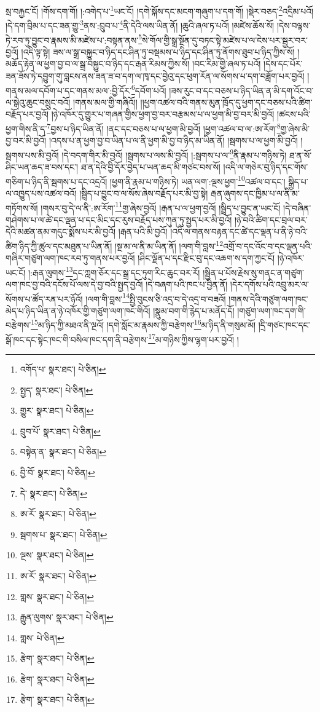 སྲ་བརྐྱང་ངོ། །གོས་དག་གོ། །:འགེད་པ་\footnote{འགོད་པ་  སྣར་ཐང་།  པེ་ཅིན། }ཡང་ངོ། །དགེ་སྐོས་དང་མངག་གཞུག་པ་དག་གོ། །སྡེར་བཅད་\footnote{སྤྱད་  སྣར་ཐང་།  པེ་ཅིན། }འདྲིམ་པའོ། །དེ་དག་བྲིམ་པ་དང་ཟན་གྱུ་\footnote{གྱུར་  སྣར་ཐང་།  པེ་ཅིན། }ནས་:བྲུབ་པ་\footnote{བྲུབ་པོ་  སྣར་ཐང་།  པེ་ཅིན། }ནི་དེའི་ལས་ཡིན་ནོ། །ཆུའི་ཞལ་ཏ་པའོ། །མཛེས་ཆོས་སོ། །དེས་བལྟས་ཏེ་རབ་ཏུ་བྱུང་བ་རྣམས་མི་མཛེས་པ་:བསྟན་ནས་\footnote{བསྟེན་ན་  སྣར་ཐང་།  པེ་ཅིན། }སེ་གོལ་གྱི་སྒྲ་སྔོན་དུ་བཏང་སྟེ་མཛེས་པ་ལ་ངེས་པར་སྦྱར་བར་བྱའོ། །འདི་ལྟ་སྟེ། ཟས་ལ་སྒྲ་བསྐྱུང་བ་ཉིད་དང་ཤིན་ཏུ་བསྡམས་པ་ཉིད་དང་ཤིན་ཏུ་ནོགས་ཐུབ་པ་ཉིད་ཀྱིས་སོ། །མཆོད་རྟེན་ལ་ཕྱག་བྱ་བ་ལ་སྒྲ་བསྐྱུང་བ་ཉིད་དང་རྒན་རིམས་ཀྱིས་སོ། །བང་རིམ་གྱི་ཞལ་ཏ་པའོ། །དེས་དང་པོར་ཟན་ཟོས་ཏེ་དབྱུག་གུ་བླངས་ནས་ཟན་ཟ་བ་དག་ལ་ཁྭ་དང་བྱེའུ་དང་ཕུག་རོན་ལ་སོགས་པ་དག་བཟློག་པར་བྱའོ། །གནས་མལ་དབོག་པ་དང་གནས་མལ་:བྱི་དོར་\footnote{བྱི་བོ་  སྣར་ཐང་།  པེ་ཅིན། }དབོག་པའོ། །ཟས་རུང་བ་དང་བཅས་པ་ཉིད་ཡིན་ན་མི་དག་འོང་བ་ལ་སྒེའུ་ཆུང་བསྲུང་བའོ། །གནས་མལ་གྱི་གཞིའོ།། །།ཕྱག་འཚལ་བའི་གནས་མུན་ཁྲོད་དུ་ཕྱག་དང་བཅས་པའི་ཚིག་བརྗོད་པར་བྱའོ། །ཉེ་འཁོར་དུ་གྱུར་པ་གཞན་གྱིས་ཕྱག་བྱ་བར་བརྩམས་པ་ལ་ཕྱག་མི་བྱ་བར་མི་བྱའོ། །ཚངས་པའི་ཕྱག་གིས་ནི་ད་\footnote{དེ་  སྣར་ཐང་།  པེ་ཅིན། }བྱས་པ་ཉིད་ཡིན་ནོ། །ནང་དང་བཅས་པ་ལ་ཕྱག་མི་བྱའོ། །ཕྱག་འཚལ་བ་ལ་:ཨ་རོག་\footnote{ཨ་རོ་  སྣར་ཐང་།  པེ་ཅིན། }གྱ་ཞེས་མི་བྱ་བར་མི་བྱའོ། །འདས་པ་ན་ཕྱག་བྱ་བ་ཡིན་པ་ལ་ནི་ཕྱག་མི་བྱ་བ་ཉིད་མ་ཡིན་ནོ། །སྦགས་པ་ལ་ཕྱག་མི་བྱའོ། །སྦགས་པས་མི་བྱའོ། །དེ་བདག་གིར་མི་བྱའོ། །སྦགས་པ་ལས་མི་བྱའོ། །:སྦགས་པ་ལ་\footnote{སྦགས་པ་  སྣར་ཐང་།  པེ་ཅིན། }ནི་རྣམ་པ་གཉིས་ཏེ། ཐ་ན་སོ་ཤིང་ཡན་ཆད་ཟ་བས་དང་། ཐ་ན་དེའི་བྱི་དོར་བྱེད་པ་ཡན་ཆད་མི་གཙང་བས་སོ། །འདི་ལ་གཅེར་བུ་ཉིད་དང་གོས་གཅིག་པ་ཉིད་ནི་སྦགས་པ་དང་འདྲའོ། །ཕྱག་ནི་རྣམ་པ་གཉིས་ཏེ། ཡན་ལག་:ལྔས་ཕྱག་\footnote{ལྔས་  སྣར་ཐང་།  པེ་ཅིན། }འཚལ་བ་དང་། སྒྱིད་པ་ལ་འཁྱུད་པས་འཚལ་བའོ། །སྦྲིད་པ་བྱུང་བ་ལ་སོས་ཞེས་བརྗོད་པར་མི་བྱ་སྟེ། རྒན་ཞུགས་དང་ཁྱིམ་པ་ལ་ནི་མ་གཏོགས་སོ། །གསར་བུ་དེ་ལ་ནི་:ཨ་རོག་\footnote{ཨ་རོ་  སྣར་ཐང་།  པེ་ཅིན། }གྱ་ཞེས་བྱའོ། །རྒན་པ་ལ་ཕྱག་བྱའོ། །སྦྲིད་པ་བྱུང་ན་ཡང་ངོ། །དེ་བཞིན་གཤེགས་པ་ལ་ཚེ་དང་ལྡན་པ་དང་མིང་དང་རུས་བརྗོད་པས་ཀུན་ཏུ་སྤྱད་པར་མི་བྱའོ། །ཉེ་བའི་ཚིག་དང་བྲལ་བར་དེའི་མཚན་ནམ་གདུང་སྨོས་པར་མི་བྱའོ། །རྒན་པའི་མི་བྱའོ། །འདི་ལ་གནས་བརྟན་དང་ཚེ་དང་ལྡན་པ་ནི་ཉེ་བའི་ཚིག་ཉིད་ཀྱི་ཚུལ་དང་མཐུན་པ་ཡིན་ནོ། །སྔ་མ་ལ་ནི་མ་ཡིན་ནོ། །ལག་གི་བླས་\footnote{གླས་  སྣར་ཐང་།  པེ་ཅིན། }འགྲོ་བ་དང་འོང་བ་དང་ལྡན་པའི་གཞིར་གཙུག་ལག་ཁང་རབ་ཏུ་གནས་པར་བྱའོ། །ཤིང་ལྗོན་པ་དང་རྫིང་བུ་དང་འཆག་ས་དག་ཀྱང་ངོ། །ཉེ་འཁོར་ཡང་ངོ། །:རྒན་ལུགས་\footnote{རྒྱུན་ལུགས་  སྣར་ཐང་།  པེ་ཅིན། }དང་ཀླག་ཅོར་དང་སྒྲ་དང་ཏུག་རིང་ཆུང་བར་རོ། །སྦྱིན་པ་པོས་རྗེས་སུ་གནང་ན་གཙུག་ལག་ཁང་བྱ་བའི་དངོས་པོ་ལས་དེ་བྱ་བའི་སྤྱད་བྱའོ། །དེ་བཞག་པའི་ཁང་པ་བྱིན་ནོ། །དེར་དགོས་པའི་འབྲུ་མར་ལ་སོགས་པ་ཚོད་རན་པར་ཉོའོ། །ལག་གི་བླས་\footnote{གླས་  པེ་ཅིན། }སྤྱི་བུངས་ཅི་འདྲ་བ་དེ་འདྲ་བ་བཟའོ། །གནས་དེའི་གཙུག་ལག་ཁང་མེད་པ་ཉིད་ཡིན་ན་ཉེ་འཁོར་གྱི་གཙུག་ལག་ཁང་གིའོ། །སྣུམ་བག་གི་རྙེད་པ་མནོད་དོ། །གཙུག་ལག་ཁང་དག་གི་བརྩེགས་\footnote{རྩེག་  སྣར་ཐང་།  པེ་ཅིན། }མ་ཉིད་ཀྱི་མཐའ་ནི་ལྔའོ། །དགེ་སློང་མ་རྣམས་ཀྱི་བརྩེགས་\footnote{རྩེག་  སྣར་ཐང་།  པེ་ཅིན། }མ་ཉིད་ནི་གསུམ་མོ། །དྲི་གཙང་ཁང་དང་སྒོ་ཁང་དང་སྟེང་ཁང་གི་བསིལ་ཁང་དག་ནི་བརྩེགས་\footnote{རྩེག་  སྣར་ཐང་།  པེ་ཅིན། }མ་གཉིས་ཀྱིས་ལྷག་པར་བྱའོ། །
